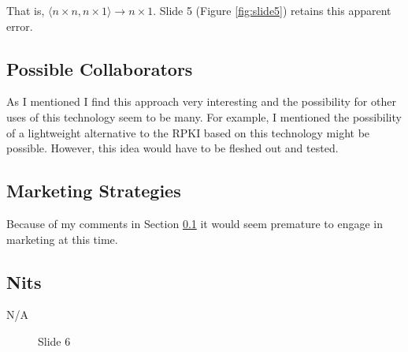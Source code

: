 \documentclass[11pt, oneside]{article}   	%
\begin{document}
\bigskip
\noindent
That is, $\big \langle n \times n, n \times 1 \big \rangle  \rightarrow n \times 1$. Slide 5 (Figure \ref{fig:slide5}) retains this apparent error.



\subsection{Possible Collaborators}
\label{slide5:possible_collaborators}
As I mentioned I find this approach very interesting and the possibility for other uses of this technology seem to be many. For example, I mentioned the possibility of 
a lightweight alternative to the RPKI  based on this technology might be possible. However, this idea would have to be fleshed out and tested.

\subsection{Marketing Strategies}
\label{slide5:marketing_strategies}
Because of my comments in Section \ref{slide5:possible_collaborators} it would seem premature to engage in marketing at this time.

\subsection{Nits}
\label{slide5:nits}
N/A



\begin{figure}[t]
\caption{Slide 6}
\label{fig:slide6}
\end{figure}
\end{document}
